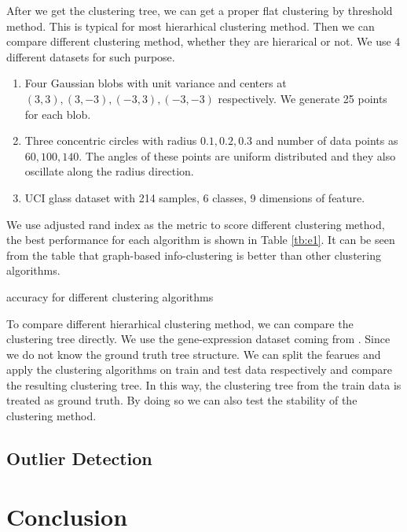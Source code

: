 After we get the clustering tree, we can get a proper flat clustering by threshold method. This is typical for most hierarhical clustering method. Then we can compare different clustering method, whether they are hierarical or not. We use 4 different datasets for such purpose.
\begin{enumerate}
\item Four Gaussian blobs with unit variance and centers at $(3,3), (3,-3), (-3,3), (-3,-3)$ respectively.  We generate 25 points for each blob.
\item Three concentric circles with radius $0.1,0.2,0.3$ and number of data points as $60, 100, 140$. The angles of these points are uniform distributed and they also oscillate along the radius direction.
\item UCI glass dataset with 214 samples, 6 classes, 9 dimensions of feature.
\end{enumerate}
We use adjusted rand index as the metric to score different clustering method, the best performance for each algorithm is shown in Table \ref{tb:e1}.  It can be seen from the table that graph-based info-clustering is better than other clustering algorithms.
\begin{table}[!ht]
\centering
{}
\caption{ accuracy for different clustering algorithms }\label{tb:e1}
\end{table}
To compare different hierarhical clustering method, we can compare the clustering tree directly. We use the gene-expression dataset coming from \cite{khan2001classification}.
Since we do not know the ground truth tree structure. We can split the fearues and apply the clustering algorithms on train and test data respectively and compare the resulting
clustering tree. In this way, the clustering tree from the train data is treated as ground truth. By doing so we can also test the stability of the clustering method.


\subsection{Outlier Detection}\label{subsec:od}
\section{Conclusion}\label{sec:conc}



